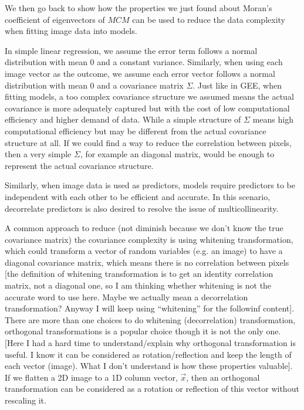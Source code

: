 \documentclass[12pt]{article}
\begin{document}
We then go back to show how the properties we just found about Moran's coefficient of eigenvectors of \( M C M \) can be used to reduce the data complexity when fitting image data into models.

In simple linear regression, we assume the error term follows a normal distribution with mean 0 and a constant variance. Similarly, when using each image vector as the outcome, we assume each error vector follows a normal distribution with mean 0 and a covariance matrix \( \Sigma \). Just like in GEE, when fitting models, a too complex covariance structure we assumed means the actual covariance is more adequately captured but with the cost of low computational efficiency and higher demand of data. While a simple structure of \( \Sigma \) means high computational efficiency but may be different from the actual covariance structure at all. If we could find a way to reduce the correlation between pixels, then a very simple \( \Sigma \), for example an diagonal matrix, would be enough to represent the actual covariance structure.

Similarly, when image data is used as predictors, models require predictors to be independent with each other to be efficient and accurate. In this scenario, decorrelate predictors is also desired to resolve the issue of multicollinearity.

A common approach to reduce (not diminish because we don't know the true covariance matrix) the covariance complexity is using whitening transformation, which could transform a vector of random variables (e.g. an image) to have a diagonal covariance matrix, which means there is no correlation between pixels [the definition of whitening transformation is to get an identity correlation matrix, not a diagonal one, so I am thinking whether whitening is not the accurate word to use here. Maybe we actually mean a decorrelation transformation? Anyway I will keep using ``whitening'' for the followinf content]. There are more than one choices to do whitening (decorrelation) transformation, orthogonal transformations is a popular choice though it is not the only one. [Here I had a hard time to understand/explain why orthogonal transformation is useful. I know it can be considered as rotation/reflection and keep the length of each vector (image). What I don't understand is how these properties valuable]. If we flatten a 2D image to a 1D column vector, \( \vec{x} \), then an orthogonal transformation can be considered as a rotation or reflection of this vector without rescaling it.
\end{document}
